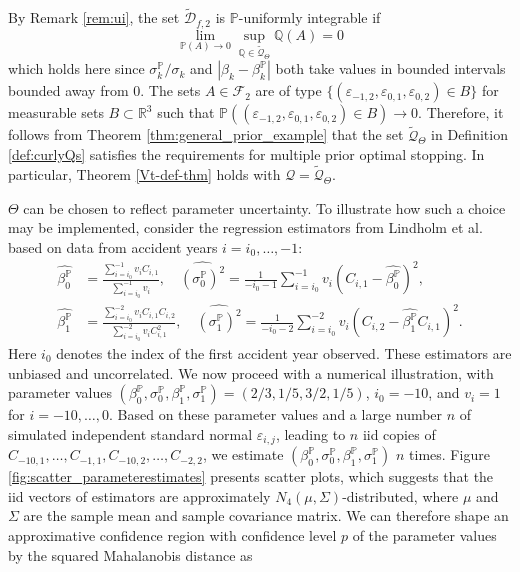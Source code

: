 \documentclass[11pt,a4paper]{article}
\renewcommand{\P}{\mathbb{P}}
\newcommand{\Q}{\mathbb{Q}}
\newcommand{\R}{\mathbb{R}}
\newcommand{\calF}{\mathcal{F}}
\newcommand{\calQ}{\mathcal{Q}}
\newcommand{\calD}{\mathcal{D}}
\begin{document}
By Remark \ref{rem:ui}, the set $\widetilde{\calD}_{f,2}$ is $\P$-uniformly integrable if 
$$
\lim_{\P(A)\to 0}\sup_{\Q\in \widetilde{\calQ}_{\Theta}}\Q(A)=0
$$
which holds here since $\sigma_k^{\P}/\sigma_k$ and $|\beta_k-\beta_k^{\P}|$ both take values in bounded intervals bounded away from $0$. The sets $A\in\calF_2$ are of type $\{(\varepsilon_{-1,2},\varepsilon_{0,1},\varepsilon_{0,2})\in B\}$ for measurable sets $B\subset \R^3$ such that $\P((\varepsilon_{-1,2},\varepsilon_{0,1},\varepsilon_{0,2})\in B)\to 0$. 
Therefore, it follows from Theorem \ref{thm:general_prior_example} that 
the set $\widetilde{\calQ}_{\Theta}$ in Definition \ref{def:curlyQs} satisfies the requirements for multiple prior optimal stopping. In particular, Theorem \ref{Vt-def-thm} holds with $\calQ=\widetilde{\calQ}_{\Theta}$.  

$\Theta$ can be chosen to reflect parameter uncertainty. 
To illustrate how such a choice may be implemented, consider the regression estimators from Lindholm et al.\cite{lindholm2017valuation} based on data from accident years $i=i_0,\dots,-1$:
\begin{align*}
\widehat{\beta_0^{\P}}&=\frac{\sum_{i=i_0}^{-1}v_iC_{i,1}}{\sum_{i=i_0}^{-1}v_i}, \quad 
\widehat{(\sigma_0^{\P})^2}=\frac{1}{-i_0-1}\sum_{i=i_0}^{-1}v_i(C_{i,1}-\widehat{\beta_0^{\P}})^2, \\
\widehat{\beta_1^{\P}}&=\frac{\sum_{i=i_0}^{-2}v_iC_{i,1}C_{i,2}}{\sum_{i=i_0}^{-2}v_iC_{i,1}^2}, \quad 
\widehat{(\sigma_1^{\P})^2}=\frac{1}{-i_0-2}\sum_{i=i_0}^{-2}v_i(C_{i,2}-\widehat{\beta_1^{\P}}C_{i,1})^2.
\end{align*}
Here $i_0$ denotes the index of the first accident year observed. These estimators are unbiased and uncorrelated. We now proceed with a numerical illustration, with parameter values $(\beta_0^{\P}, \sigma_0^{\P}, \beta_1^{\P}, \sigma_1^{\P})= (2/3,1/5,3/2,1/5)$, $i_0=-10$, and $v_i=1$ for $i=-10,\dots,0$. Based on these parameter values and a large number $n$ of simulated independent standard normal $\varepsilon_{i,j}$, leading to  $n$ iid copies of $C_{-10,1},\dots,C_{-1,1},C_{-10,2},\dots,C_{-2,2}$, we estimate $(\beta_0^{\P}, \sigma_0^{\P}, \beta_1^{\P}, \sigma_1^{\P})$ $n$ times. 
Figure \ref{fig:scatter_parameterestimates} presents scatter plots, which suggests that the iid vectors of estimators are approximately $N_{4}(\mu,\Sigma)$-distributed, where $\mu$ and $\Sigma$ are the sample mean and sample covariance matrix. We can therefore shape an approximative  confidence region with confidence level $p$ of the parameter values by the squared Mahalanobis distance as
\end{document}
